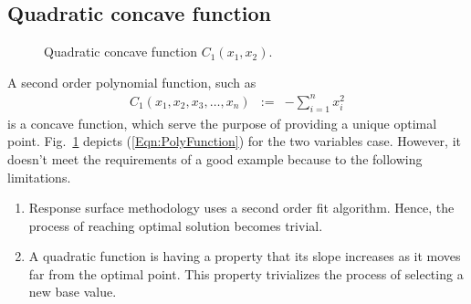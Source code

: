 \documentclass[twocolumn]{svjour3}          %
\begin{document}
\subsection{Quadratic concave function}
\begin{figure}
	\centering
	\caption{Quadratic concave function $C_1(x_1, x_2)$.}
	\label{Fig:TwoVariablePolynomial}
\end{figure}
A second order polynomial function, such as
\begin{eqnarray}
C_1(x_1, x_2, x_3, \dots, x_n) &:=& -\sum_{i=1}^{n}{x_i^2} \label{Eqn:PolyFunction}
\end{eqnarray}
is a concave function, which serve the purpose of providing a unique optimal point. Fig.~\ref{Fig:TwoVariablePolynomial} depicts (\ref{Eqn:PolyFunction}) for the two variables case. However, it doesn't meet the requirements of a good example because to the following limitations.
\begin{enumerate}
	\item Response surface methodology uses a second order fit algorithm. Hence, the process of reaching optimal solution becomes trivial.
	\item A quadratic function is having a property that its slope increases as it moves far from the optimal point. This property trivializes the process of selecting a new base value.
\end{enumerate}
\end{document}
